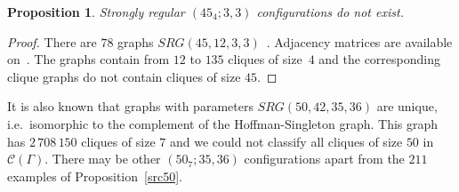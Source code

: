 \documentclass[12pt, reqno]{amsart}
\newtheorem{proposition}[theorem]{Proposition}
\def\C{\mathcal{C}}
\begin{document}
\begin{proposition}\label{non45-4}
Strongly regular $(45_4;3,3)$ configurations do not exist.
\end{proposition}

\begin{proof}
There are $78$ graphs $SRG(45,12,3,3)$~\cite{CDS06}.
Adjacency matrices are available on~\cite{ES}. The graphs contain
from $12$ to $135$ cliques of size~$4$ and the corresponding clique
graphs do not contain cliques of size $45$.
\end{proof}

It is also known that graphs with parameters $SRG(50,42,35,36)$ are unique, i.e.\
isomorphic to the complement of the Hoffman-Singleton graph.
This graph has $2\,708\,150$ cliques of size $7$ and we could not classify
all cliques of size $50$ in $\C(\Gamma)$. There may be other $(50_7;35,36)$
configurations apart from the $211$ examples of Proposition~\ref{src50}.
\end{document}
